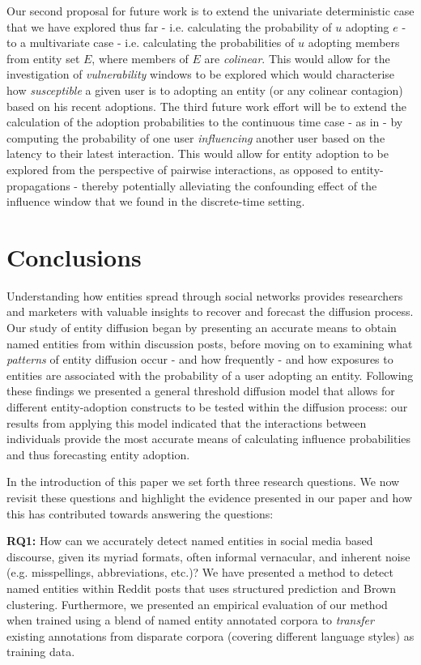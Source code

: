 \documentclass[review]{elsarticle}
\begin{document}
Our second proposal for future work is to extend the univariate deterministic case that we have explored thus far - i.e. calculating the probability of $u$ adopting $e$ - to a multivariate case - i.e. calculating the probabilities of $u$ adopting members from entity set $E$, where members of $E$ are \emph{colinear}.
This would allow for the investigation of \emph{vulnerability} windows to be explored which would characterise how \emph{susceptible} a given user is to adopting an entity (or any colinear contagion) based on his recent adoptions.
The third future work effort will be to extend the calculation of the adoption probabilities to the continuous time case - as in \cite{huang2014temporal} - by computing the probability of one user \emph{influencing} another user based on the latency to their latest interaction.
This would allow for entity adoption to be explored from the perspective of pairwise interactions, as opposed to entity-propagations - thereby potentially alleviating the confounding effect of the influence window that we found in the discrete-time setting.




\section{Conclusions}
\label{sec:conclusions}
Understanding how entities spread through social networks provides researchers and marketers with valuable insights to recover and forecast the diffusion process.
Our study of entity diffusion began by presenting an accurate means to obtain named entities from within discussion posts, before moving on to examining what \emph{patterns} of entity diffusion occur - and how frequently - and how exposures to entities are associated with the probability of a user adopting an entity.
Following these findings we presented a general threshold diffusion model that allows for different entity-adoption constructs to be tested within the diffusion process: our results from applying this model indicated that the interactions between individuals provide the most accurate means of calculating influence probabilities and thus forecasting entity adoption.

In the introduction of this paper we set forth three research questions. 
We now revisit these questions and highlight the evidence presented in our paper and how this has contributed towards answering the questions:

\textbf{RQ1:} How can we accurately detect named entities in social media based discourse, given its myriad formats, often informal vernacular, and inherent noise (e.g. misspellings, abbreviations, etc.)?
We have presented a method to detect named entities within Reddit posts that uses structured prediction and Brown clustering.
Furthermore, we presented an empirical evaluation of our method when trained using a blend of named entity annotated corpora to \emph{transfer} existing annotations from disparate corpora (covering different language styles) as training data.
\end{document}
